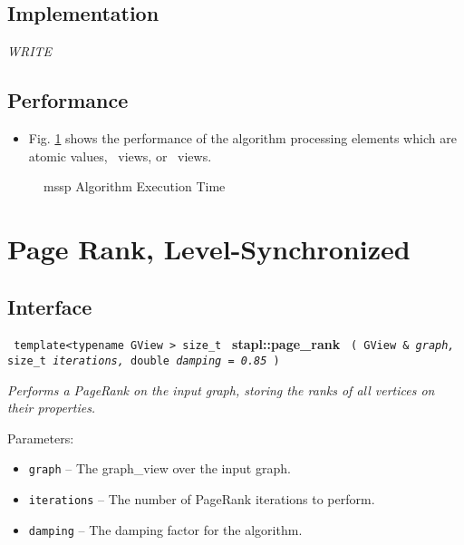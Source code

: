 \subsection{Implementation} \label{sec-mssp-alg-impl}

\textit{WRITE}

\subsection{Performance} \label{sec-mssp-alg-perf}

\begin{itemize}
\item
Fig. \ref{fig:mssp-alg-exec-exper}
shows the performance of the algorithm processing
elements which are atomic values, \stl\ views, or \stapl\ views.
\end{itemize}

\begin{figure}[p]
\caption{mssp Algorithm Execution Time}
\label{fig:mssp-alg-exec-exper}
\end{figure}


\section{ Page Rank, Level-Synchronized}
\label{sec-page-rank-alg}

\subsection{Interface} \label{sec-page-rank-alg-inter}

\noindent
\texttt{%
template<typename GView >
\newline
size\_t 
}
\newline
\textbf{stapl::page\_rank}%
\newline
\texttt{%
(
GView \&
\textit{graph,}%
size\_t
\textit{iterations,}%
double
\textit{damping = 0.85}%
)     
}
\vspace{0.4cm}

\textit{
Performs a PageRank on the input graph, storing the ranks of all vertices on their properties.
}
\vspace{0.4cm}

Parameters:
\begin{itemize}
\item
\texttt{graph} --
The graph\_view over the input graph.
\item
\texttt{iterations} --
The number of PageRank iterations to perform.
\item
\texttt{damping} --
The damping factor for the algorithm.
\end{itemize}

